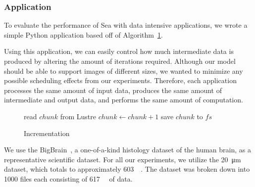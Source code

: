 \documentclass[10pt,journal,compsoc]{IEEEtran}
\makeatletter
\newcommand{\removelatexerror}{\let\@latex@error\@gobble}
\makeatother
\begin{document}
\subsubsection{Application}


      To evaluate the performance of Sea with data intensive applications, we wrote a simple Python
      application based off of Algorithm~\ref{alg:sea-comp:incrementation}.
      
      Using this application, we can easily control how much intermediate data
      is produced by altering the amount of iterations required. Although our
      model should be able to support images of different sizes, we wanted to
      minimize any possible scheduling effects from our experiments. Therefore,
      each application processes the same amount of input data, produces the
      same amount of intermediate and output data, and performs the same amount
      of computation.
                                                                                   

      \begin{figure}[!t]
        \removelatexerror
        \begin{algorithm}[H]
          \caption{Incrementation}\label{alg:sea-comp:incrementation}
          \SetAlgoLined {}   { read $chunk$ from Lustre  { $chunk\gets chunk+1$ save $chunk$ to $fs$ } }
        \end{algorithm}
      \end{figure}

      We use the BigBrain~\cite{amunts2013bigbrain}, a one-of-a-kind histology
      dataset of the human brain, as a representative scientific dataset. For
      all our experiments, we utilize the \SI{20}{\micro\meter} dataset, which
      totals to approximately \SI{603}{\gibi\byte}. The dataset was broken down
      into 1000 files each consisting of \SI{617}{\mebi\byte} of data.
      
\end{document}
